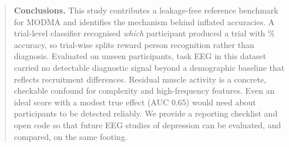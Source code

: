 \begin{abstract}
\noindent\textbf{Conclusions.} This study contributes a leakage-free reference benchmark for MODMA and identifies
the mechanism behind inflated accuracies. A trial-level classifier recognised \emph{which} participant produced a
trial with \AudIdentAcc\% accuracy, so trial-wise splits reward person recognition rather than diagnosis. Evaluated
on unseen participants, task EEG in this dataset carried no detectable diagnostic signal beyond a demographic baseline
that reflects recruitment differences. Residual muscle activity is a concrete, checkable confound for complexity and
high-frequency features. Even an ideal score with a modest true effect (AUC 0.65) would need about
\AudNNeedSixtyFive{} participants to be detected reliably. We provide a reporting checklist and open code so that
future EEG studies of depression can be evaluated, and compared, on the same footing.
\end{abstract}

